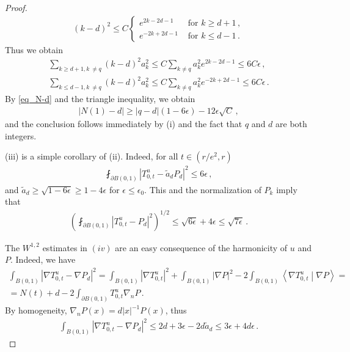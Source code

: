 \documentclass[11pt]{article}
\begin{document}
\begin{proof}
\begin{gather}
 (k-d)^2 \leq C\begin{cases}
               e^{2k-2d-1} & \text{ for } k\geq d+1\, ,\\
               e^{-2k+2d-1}& \text{ for } k\leq d-1\, .
              \end{cases}
\end{gather}
Thus we obtain
\begin{gather}
 \sum_{k\geq d+1, k\ \neq q} (k-d)^2 a_k^2  \leq C \sum_{k\neq q} a_k^2 e^{2k-2d-1} \leq 6 C\epsilon \, ,\\
 \sum_{k\leq d-1, k\ \neq q} (k-d)^2 a_k^2  \leq C \sum_{k\neq q} a_k^2 e^{-2k+2d-1} \leq 6 C\epsilon \, .
\end{gather}
By \eqref{eq_N-d} and the triangle inequality, we obtain
\begin{gather}
 {\left|{N(1)-d}\right|} \geq {\left|{q-d}\right|} (1-6\epsilon) - 12 \epsilon \sqrt C\, ,
\end{gather}
and the conclusion follows immediately by (i) and the fact that $q$ and $d$ are both integers.

(iii) is a simple corollary of (ii). Indeed, for all $t\in (r/e^2,r)$
 \begin{gather}
  \fint_{\partial B(0,1)} {\left|{T_{0,t}^u - \tilde a_d P_d}\right|}^2 \leq 6 \epsilon\, ,
 \end{gather}
and $\tilde a_d \geq \sqrt{1-6\epsilon}\geq 1-4\epsilon$ for $\epsilon\leq \epsilon_0$. This and the normalization of $P_k$ imply that 
 \begin{gather}
  {\left({\fint_{\partial B(0,1)} {\left|{T_{0,t}^u - P_d}\right|}^2 }\right)}^{1/2}\leq \sqrt{6 \epsilon} + 4\epsilon\leq \sqrt{7\epsilon}\, .
 \end{gather}

 The $W^{1,2}$ estimates in $(iv)$ are an easy consequence of the harmonicity of $u$ and $P$. Indeed, we have
\begin{gather}
 \int_{B(0,1)} {\left|{\nabla T_{0,t}^u - \nabla P_d}\right|}^2 = \int_{B(0,1)} {\left|{\nabla T_{0,t}^u}\right|}^2 + \int_{B(0,1)} {\left|{\nabla P}\right|}^2 - 2 \int_{B(0,1)} {\left\langle{\nabla T_{0,t}^u}\middle\vert{\nabla P}\right\rangle} =\\
 = N(t) +d - 2 \int_{\partial B(0,1)} T_{0,t}^u\nabla _n P\, .
\end{gather}
By homogeneity, $\nabla_n P (x)= d{\left|{x}\right|}^{-1} P(x)$, thus
\begin{gather}
 \int_{B(0,1)} {\left|{\nabla T_{0,t}^u - \nabla P_d}\right|}^2 \leq 2d + 3\epsilon - 2d\tilde a_d \leq 3\epsilon + 4d\epsilon\, .
\end{gather}

 \end{proof}
\end{document}
